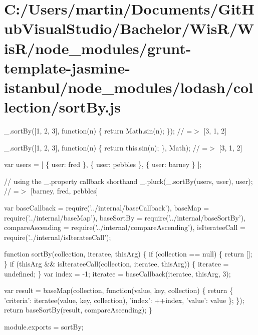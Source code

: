 \hypertarget{_c_1_2_users_2martin_2_documents_2_git_hub_visual_studio_2_bachelor_2_wis_r_2_wis_r_2node_modulea0efb9e176d11e35081f3b4d0aa6596d}{}\section{C\+:/\+Users/martin/\+Documents/\+Git\+Hub\+Visual\+Studio/\+Bachelor/\+Wis\+R/\+Wis\+R/node\+\_\+modules/grunt-\/template-\/jasmine-\/istanbul/node\+\_\+modules/lodash/collection/sort\+By.\+js}
\+\_\+.\+sort\+By(\mbox{[}1, 2, 3\mbox{]}, function(n) \{ return Math.\+sin(n); \}); // =$>$ \mbox{[}3, 1, 2\mbox{]}

\+\_\+.\+sort\+By(\mbox{[}1, 2, 3\mbox{]}, function(n) \{ return this.\+sin(n); \}, Math); // =$>$ \mbox{[}3, 1, 2\mbox{]}

var users = \mbox{[} \{ \textquotesingle{}user\textquotesingle{}\+: \textquotesingle{}fred\textquotesingle{} \}, \{ \textquotesingle{}user\textquotesingle{}\+: \textquotesingle{}pebbles\textquotesingle{} \}, \{ \textquotesingle{}user\textquotesingle{}\+: \textquotesingle{}barney\textquotesingle{} \} \mbox{]};

// using the {\ttfamily \+\_\+.\+property} callback shorthand \+\_\+.\+pluck(\+\_\+.\+sort\+By(users, \textquotesingle{}user\textquotesingle{}), \textquotesingle{}user\textquotesingle{}); // =$>$ \mbox{[}\textquotesingle{}barney\textquotesingle{}, \textquotesingle{}fred\textquotesingle{}, \textquotesingle{}pebbles\textquotesingle{}\mbox{]}


\begin{DoxyCodeInclude}
var baseCallback = require(\textcolor{stringliteral}{'../internal/baseCallback'}),
    baseMap = require(\textcolor{stringliteral}{'../internal/baseMap'}),
    baseSortBy = require(\textcolor{stringliteral}{'../internal/baseSortBy'}),
    compareAscending = require(\textcolor{stringliteral}{'../internal/compareAscending'}),
    isIterateeCall = require(\textcolor{stringliteral}{'../internal/isIterateeCall'});

\textcolor{keyword}{function} sortBy(collection, iteratee, thisArg) \{
  \textcolor{keywordflow}{if} (collection == null) \{
    \textcolor{keywordflow}{return} [];
  \}
  \textcolor{keywordflow}{if} (thisArg && isIterateeCall(collection, iteratee, thisArg)) \{
    iteratee = undefined;
  \}
  var index = -1;
  iteratee = baseCallback(iteratee, thisArg, 3);

  var result = baseMap(collection, \textcolor{keyword}{function}(value, key, collection) \{
    \textcolor{keywordflow}{return} \{ \textcolor{stringliteral}{'criteria'}: iteratee(value, key, collection), \textcolor{stringliteral}{'index'}: ++index, \textcolor{stringliteral}{'value'}: value \};
  \});
  \textcolor{keywordflow}{return} baseSortBy(result, compareAscending);
\}

module.exports = sortBy;
\end{DoxyCodeInclude}
 